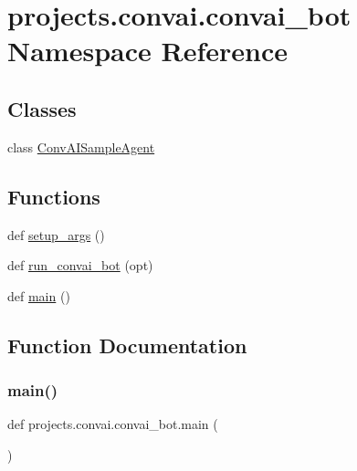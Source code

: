 \hypertarget{namespaceprojects_1_1convai_1_1convai__bot}{}\section{projects.\+convai.\+convai\+\_\+bot Namespace Reference}
\label{namespaceprojects_1_1convai_1_1convai__bot}
\subsection*{Classes}
\begin{DoxyCompactItemize}
\item 
class \hyperlink{classprojects_1_1convai_1_1convai__bot_1_1ConvAISampleAgent}{Conv\+A\+I\+Sample\+Agent}
\end{DoxyCompactItemize}
\subsection*{Functions}
\begin{DoxyCompactItemize}
\item 
def \hyperlink{namespaceprojects_1_1convai_1_1convai__bot_abb3f83d4277a55c3f972f0f77d9066a7}{setup\+\_\+args} ()
\item 
def \hyperlink{namespaceprojects_1_1convai_1_1convai__bot_a370a74521f78bc526eb9264aeb289f65}{run\+\_\+convai\+\_\+bot} (opt)
\item 
def \hyperlink{namespaceprojects_1_1convai_1_1convai__bot_a20f231e61b1255f9d9a5de5e77f063bf}{main} ()
\end{DoxyCompactItemize}


\subsection{Function Documentation}
\mbox{\label{namespaceprojects_1_1convai_1_1convai__bot_a20f231e61b1255f9d9a5de5e77f063bf}} 
\subsubsection{\texorpdfstring{main()}{main()}}
{\footnotesize\ttfamily def projects.\+convai.\+convai\+\_\+bot.\+main (\begin{DoxyParamCaption}{ }\end{DoxyParamCaption})}



